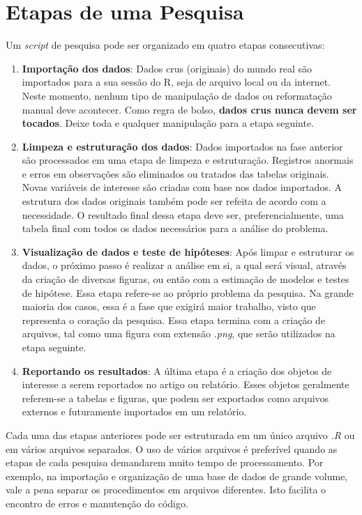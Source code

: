 \documentclass[
  11pt,
]{book}
\begin{document}
\hypertarget{etapas-de-uma-pesquisa}{%
\section{Etapas de uma Pesquisa}\label{etapas-de-uma-pesquisa}}

Um \emph{script} de pesquisa pode ser organizado em quatro etapas consecutivas:

\begin{enumerate}
\def\labelenumi{\arabic{enumi}.}
\item
  \textbf{Importação dos dados}: Dados crus (originais) do mundo real são importados para a sua sessão do R, seja de arquivo local ou da internet. Neste momento, nenhum tipo de manipulação de dados ou reformatação manual deve acontecer. Como regra de bolso, \textbf{dados crus nunca devem ser tocados}. Deixe toda e qualquer manipulação para a etapa seguinte.
\item
  \textbf{Limpeza e estruturação dos dados}: Dados importados na fase anterior são processados em uma etapa de limpeza e estruturação. Registros anormais e erros em observações são eliminados ou tratados das tabelas originais. Novas variáveis de interesse são criadas com base nos dados importados. A estrutura dos dados originais também pode ser refeita de acordo com a necessidade. O resultado final dessa etapa deve ser, preferencialmente, uma tabela final com todos os dados necessários para a análise do problema.
\item
  \textbf{Visualização de dados e teste de hipóteses}: Após limpar e estruturar os dados, o próximo passo é realizar a análise em si, a qual será visual, através da criação de diversas figuras, ou então com a estimação de modelos e testes de hipótese. Essa etapa refere-se ao próprio problema da pesquisa. Na grande maioria dos casos, essa é a fase que exigirá maior trabalho, visto que representa o coração da pesquisa. Essa etapa termina com a criação de arquivos, tal como uma figura com extensão \emph{.png}, que serão utilizados na etapa seguinte.
\item
  \textbf{Reportando os resultados}: A última etapa é a criação dos objetos de interesse a serem reportados no artigo ou relatório. Esses objetos geralmente referem-se a tabelas e figuras, que podem ser exportados como arquivos externos e futuramente importados em um relatório.
\end{enumerate}

Cada uma das etapas anteriores pode ser estruturada em um único arquivo \emph{.R} ou em vários arquivos separados. O uso de vários arquivos é preferível quando as etapas de cada pesquisa demandarem muito tempo de processamento. Por exemplo, na importação e organização de uma base de dados de grande volume, vale a pena separar os procedimentos em arquivos diferentes. Isto facilita o encontro de erros e manutenção do código.
\end{document}
